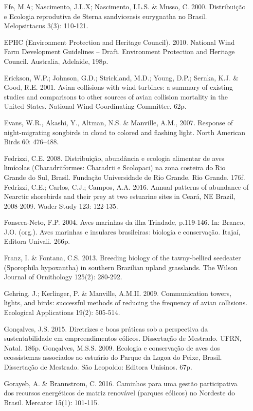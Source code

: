 \documentclass[
]{scrbook}
\begin{document}
Efe, M.A; Nascimento, J.L.X; Nascimento, I.L.S. \& Musso, C. 2000. Distribuição e Ecologia reprodutiva de Sterna sandvicensis eurygnatha no Brasil. Melopsittacus 3(3): 110-121.

EPHC (Environment Protection and Heritage Council). 2010. National Wind Farm Development Guidelines -- Draft. Environment Protection and Heritage Council. Australia, Adelaide, 198p.

Erickson, W.P.; Johnson, G.D.; Strickland, M.D.; Young, D.P.; Sernka, K.J. \& Good, R.E. 2001. Avian collisions with wind turbines: a summary of existing studies and comparisons to other sources of avian collision mortality in the United States. National Wind Coordinating Committee. 62p.

Evans, W.R., Akashi, Y., Altman, N.S. \& Manville, A.M., 2007. Response of night-migrating songbirds in cloud to colored and flashing light. North American Birds 60: 476--488.

Fedrizzi, C.E. 2008. Distribuição, abundância e ecologia alimentar de aves limícolas (Charadriiformes: Charadrii e Scolopaci) na zona costeira do Rio Grande do Sul, Brasil. Fundação Universidade de Rio Grande, Rio Grande. 176f.
Fedrizzi, C.E.; Carlos, C.J.; Campos, A.A. 2016. Annual patterns of abundance of Nearctic shorebirds and their prey at two estuarine sites in Ceará, NE Brazil, 2008-2009. Wader Study 123: 122-135.

Fonseca-Neto, F.P. 2004. Aves marinhas da ilha Trindade, p.119-146. In: Branco, J.O. (org.). Aves marinhas e insulares brasileiras: biologia e conservação. Itajaí, Editora Univali. 266p.

Franz, I. \& Fontana, C.S. 2013. Breeding biology of the tawny-bellied seedeater (Sporophila hypoxantha) in southern Brazilian upland grasslands. The Wilson Journal of Ornithology 125(2): 280-292.

Gehring, J.; Kerlinger, P. \& Manville, A.M.II. 2009. Communication towers, lights, and birds: successful methods of reducing the frequency of avian collisions. Ecological Applications 19(2): 505-514.

Gonçalves, J.S. 2015. Diretrizes e boas práticas sob a perspectiva da sustentabilidade em empreendimentos eólicos. Dissertação de Mestrado. UFRN, Natal. 186p.
Gonçalves, M.S.S. 2009. Ecologia e conservação de aves dos ecossistemas associados ao estuário do Parque da Lagoa do Peixe, Brasil. Dissertação de Mestrado. São Leopoldo: Editora Unisinos. 67p.

Gorayeb, A. \& Brannstrom, C. 2016. Caminhos para uma gestão participativa dos recursos energéticos de matriz renovável (parques eólicos) no Nordeste do Brasil. Mercator 15(1): 101-115.
\end{document}
